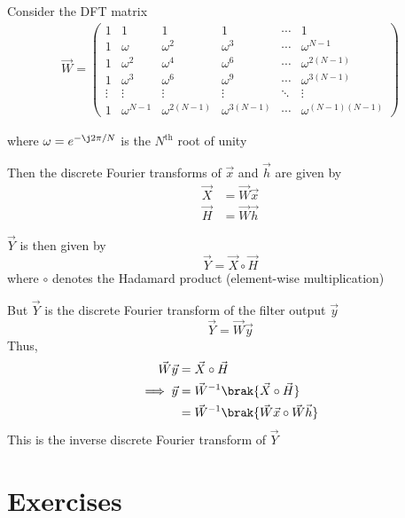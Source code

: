 \documentclass[journal,12pt,twocolumn]{IEEEtran}
\newcommand{\myvec}[1]{\ensuremath{\begin{pmatrix}#1\end{pmatrix}}}
\renewcommand\thesection{\arabic{section}}
\begin{document}
\begin{enumerate}[label=\thesection.\arabic*]
	Consider the DFT matrix
	\begin{align}
		\vec{W} = \myvec{
			1 & 1 & 1 & 1 & \cdots & 1 \\
			1 & \omega & \omega^2 & \omega^3 & \cdots & \omega^{N-1} \\
			1 & \omega^2 & \omega^4 & \omega^6 & \cdots & \omega^{2(N-1)} \\
			1 & \omega^3 & \omega^6 & \omega^9 & \cdots & \omega^{3(N-1)} \\
			\vdots & \vdots & \vdots & \vdots & \ddots & \vdots \\ 
			1 & \omega^{N-1} & \omega^{2(N-1)} & \omega^{3(N-1)} & \cdots & \omega^{(N-1)(N-1)}
		}
	\end{align}
	
	where $\omega = e^{-\j 2\pi/N}$ is the $N^{\mathrm{th}}$ root of unity
	
	Then the discrete Fourier transforms of $\vec{x}$ and $\vec{h}$ are given by
	\begin{align}
		\vec{X} &= \vec{W} \vec{x} \\
		\vec{H} &= \vec{W} \vec{h}
	\end{align}
	
	$\vec{Y}$ is then given by
	\begin{equation}
		\vec{Y} = \vec{X} \circ \vec{H}
	\end{equation}
	where $\circ$ denotes the Hadamard product (element-wise multiplication)
	
	But $\vec{Y}$ is the discrete Fourier transform of the filter output $\vec{y}$
	\begin{equation}
		\vec{Y} = \vec{W} \vec{y}
	\end{equation}
	Thus,
	\begin{align}
		\vec{W} \vec{y} &= \vec{X} \circ \vec{H} \\
		\implies \vec{y} &= \vec{W}^{-1} \brak{\vec{X} \circ \vec{H}} \\
		&= \vec{W}^{-1} \brak{\vec{W} \vec{x} \circ \vec{W} \vec{h}}
	\end{align}
	This is the inverse discrete Fourier transform of $\vec{Y}$
\end{enumerate}
%
\section{Exercises}
\end{document}
